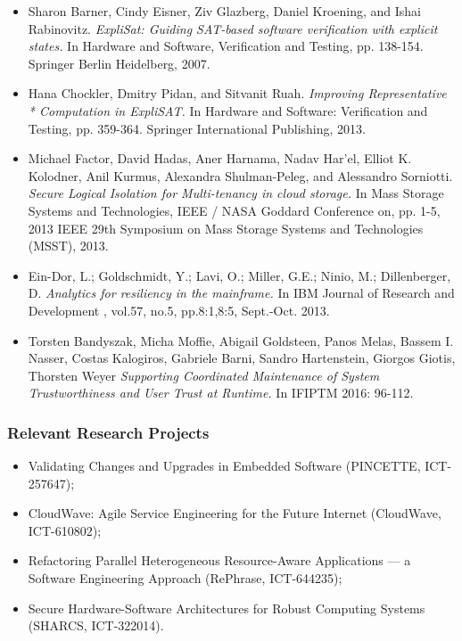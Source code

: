 \documentclass[a4paper,11pt]{article}
\begin{document}
\begin{itemize}
 \item Sharon Barner, Cindy Eisner, Ziv Glazberg, Daniel Kroening, and Ishai Rabinovitz. 
 \newblock \textit{ExpliSat: Guiding SAT-based software verification with explicit states.}
 \newblock In Hardware and Software, Verification and Testing, pp. 138-154. Springer Berlin Heidelberg, 2007. 


\item Hana Chockler, Dmitry Pidan, and Sitvanit Ruah. 
\newblock \textit{Improving Representative * Computation in ExpliSAT.}
\newblock In Hardware and Software: Verification and Testing, pp. 359-364. Springer International Publishing, 2013.

\item Michael Factor, David Hadas, Aner Harnama, Nadav Har'el, Elliot K. Kolodner, Anil Kurmus, Alexandra Shulman-Peleg, and Alessandro Sorniotti.
\newblock \textit{Secure Logical Isolation for Multi-tenancy in cloud storage.} 
\newblock In Mass Storage Systems and Technologies, IEEE / NASA Goddard Conference on, pp. 1-5, 2013 IEEE 29th Symposium on Mass Storage Systems and Technologies (MSST), 2013.

\item Ein-Dor, L.; Goldschmidt, Y.; Lavi, O.; Miller, G.E.; Ninio, M.; Dillenberger, D.
\newblock \textit{Analytics for resiliency in the mainframe.} 
\newblock In IBM Journal of Research and Development , vol.57, no.5, pp.8:1,8:5, Sept.-Oct. 2013.
 
\item Torsten Bandyszak, Micha Moffie, Abigail Goldsteen, Panos Melas, Bassem I. Nasser, Costas Kalogiros, Gabriele Barni, Sandro Hartenstein, Giorgos Giotis, Thorsten Weyer
\newblock \textit{Supporting Coordinated Maintenance of System Trustworthiness and User Trust at Runtime.}
\newblock In IFIPTM 2016: 96-112. 
\end{itemize}

\subsubsection*{Relevant Research Projects}
\begin{itemize}
\item
Validating Changes and Upgrades in Embedded Software (PINCETTE, ICT-257647);
\item
CloudWave: Agile Service Engineering for the Future Internet (CloudWave, ICT-610802);
\item
Refactoring Parallel Heterogeneous Resource-Aware Applications --- a Software Engineering Approach (RePhrase, ICT-644235);
\item
Secure Hardware-Software Architectures for Robust Computing Systems (SHARCS, ICT-322014).

\end{itemize}
\end{document}
